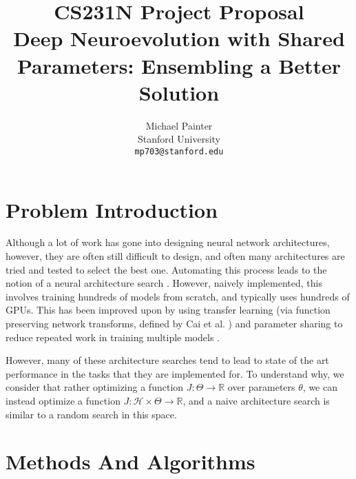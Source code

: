\documentclass[10pt,letterpaper]{article}
\begin{document}
\title{CS231N Project Proposal \\ Deep Neuroevolution with Shared Parameters: Ensembling a Better Solution}

\author{Michael Painter\\
Stanford University\\
{\tt\small mp703@stanford.edu}
}

\maketitle

\newcommand{\cH}{\mathcal{H}}
\newcommand{\cX}{\mathcal{X}}
\newcommand{\cY}{\mathcal{Y}}

\section{Problem Introduction}
Although a lot of work has gone into designing neural network architectures, however, they are often still difficult to design, and often many architectures are tried and tested to select the best one. Automating this process leads to the notion of a neural architecture search \cite{as2, as1, as3}. However, naively implemented, this involves training hundreds of models from scratch, and typically uses hundreds of GPUs. This has been improved upon by using transfer learning (via function preserving network transforms, defined by Cai et al. \cite{net2net}) and parameter sharing to reduce repeated work in training multiple models \cite{eas1, eas2}.

However, many of these architecture searches tend to lead to state of the art performance in the tasks that they are implemented for. To understand why, we consider that rather optimizing a function $J : \Theta \rightarrow \mathbb{R}$ over parameters $\theta$, we can instead optimize a function $J : \cH \times\Theta \rightarrow \mathbb{R}$, and a naive architecture search is similar to a random search in this space.

\section{Methods And Algorithms}
\end{document}

